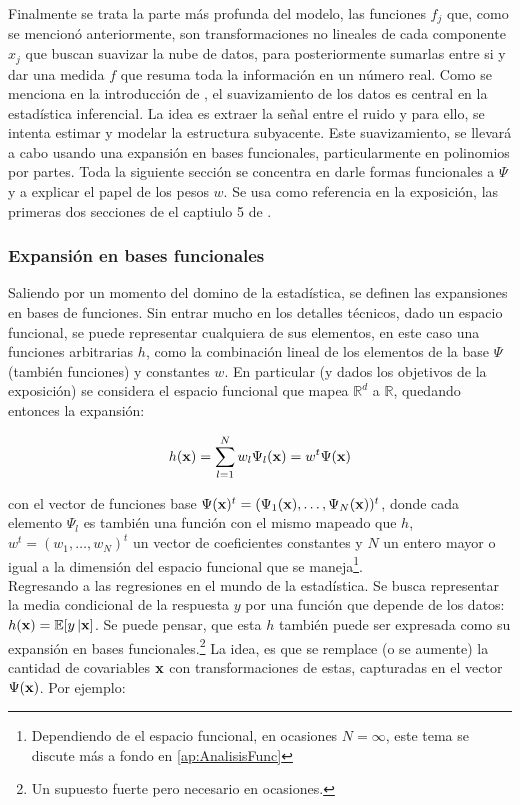 \documentclass[../Main/Main.tex]{subfiles}
\begin{document}
Finalmente se trata la parte más profunda del modelo, las funciones $f_j$  que, como se mencionó anteriormente, son transformaciones no lineales de cada componente $x_j$ que buscan suavizar la nube de datos, para posteriormente sumarlas entre si y dar una medida $f$ que resuma toda la información en un número real. Como se menciona en la introducción de \autocite{hardle2004semiparametric}, el suavizamiento de los datos es central en la estadística inferencial. La idea es extraer la señal entre el ruido y para ello, se intenta estimar y modelar la estructura subyacente. Este suavizamiento, se llevará a cabo usando una expansión en bases funcionales, particularmente en polinomios por partes. Toda la siguiente sección se concentra en darle formas funcionales a $\Psi$ y a explicar el papel de los pesos $w$. Se usa como referencia en la exposición, las primeras dos secciones de el captiulo 5 de \autocite{hastie2008elements}. \\

\subsubsection{Expansión en bases funcionales}
Saliendo por un momento del domino de la estadística, se definen las expansiones en bases de funciones. Sin entrar mucho en los detalles técnicos, dado un espacio funcional, se puede representar cualquiera de sus elementos, en este caso una funciones arbitrarias $h$, como la combinación lineal de los elementos de la base $\Psi$ (también funciones) y constantes $w$. En particular (y dados los objetivos de la exposición) se considera el espacio funcional que mapea $\mathbb{R}^d$ a $\mathbb{R}$, quedando entonces la expansión: 

\begin{align} 
	h(\mathbf{x}) = \sum_{l = 1}^N w_l\Psi_l(\mathbf{x}) = w^t\Psi(\mathbf{x}) \label{ec:ExpansionBases2}
\end{align}

con el vector de funciones base $\Psi(\mathbf{x})^t = (\Psi_1(\mathbf{x}),\ldots,\Psi_N(\mathbf{x}))^t$, donde cada elemento $\Psi_l$ es también una función con el mismo mapeado que $h$, $w^t = (w_1,\ldots,w_N)^t$  un vector de coeficientes constantes y $N$ un entero mayor o igual a la dimensión del espacio funcional que se maneja\footnote{Dependiendo de el espacio funcional, en ocasiones $N = \infty$, este tema se discute más a fondo en \ref{ap:AnalisisFunc}}.\\

Regresando a las regresiones en el mundo de la estadística. Se busca representar la media condicional de la respuesta $y$ por una función que depende de los datos: $h(\mathbf{x}) = \mathbb{E}[y\,|\mathbf{x}]$. Se puede pensar, que esta $h$ también puede ser expresada como su expansión en bases funcionales.\footnote{Un supuesto fuerte pero necesario en ocasiones.} La idea, es que se remplace (o se aumente) la cantidad de covariables $\mathbf{x}$ con transformaciones de estas, capturadas en el vector $\Psi(\mathbf{x})$. Por ejemplo:
\end{document}

